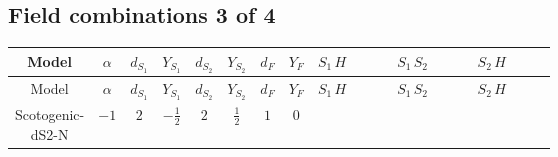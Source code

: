 \documentclass[8pt]{article}
\begin{document}
\begin{landscape}
\subsection*{Field combinations 3 of 4}
\begin{longtable}{@{}cccccccc >{\raggedright\arraybackslash}p{0.21\linewidth} >{\raggedright\arraybackslash}p{0.21\linewidth} >{\raggedright\arraybackslash}p{0.21\linewidth}@{}}
\toprule
Model & $\alpha$ & $d_{S_1}$ & $Y_{S_1}$ & $d_{S_2}$ & $Y_{S_2}$ & $d_F$ & $Y_F$ & $S_1\,H$ & $S_1\,S_2$ & $S_2\,H$ \\
\midrule
\endfirsthead
\toprule
Model & $\alpha$ & $d_{S_1}$ & $Y_{S_1}$ & $d_{S_2}$ & $Y_{S_2}$ & $d_F$ & $Y_F$ & $S_1\,H$ & $S_1\,S_2$ & $S_2\,H$ \\
\midrule
\endhead
Scotogenic-dS2-N & $-1$ & $2$ & $-\frac{1}{2}$ & $2$ & $\frac{1}{2}$ & $1$ & $0$ & \scriptsize\adjustbox{max width=\linewidth}{$\begin{gathered} +H_{a_2} S_{1,j_2} H_{a_1}{}^{\dagger } S_{1,j_1}{}^{\dagger } \mathcal{I}_{H1,a_1,a_2,j_1,j_2}{}^1 \lambda_{HS_1}^{(1)}^{(1)} \\ +H_{a_2} S_{1,j_2} H_{a_1}{}^{\dagger } S_{1,j_1}{}^{\dagger } \mathcal{I}_{H1,a_1,a_2,j_1,j_2}{}^2 \lambda_{HS_1}^{(1)}^{(2)}\end{gathered}$} & \scriptsize\adjustbox{max width=\linewidth}{$\begin{gathered} +S_{1,j_3} S_{2,j_4} S_{1,j_1}{}^{\dagger } S_{2,j_2}{}^{\dagger } \mathcal{I}_{12,j_1,j_3,j_2,j_4}{}^1 \lambda_{12}^{(1)}^{(1)} \\ +S_{1,j_3} S_{2,j_4} S_{1,j_1}{}^{\dagger } S_{2,j_2}{}^{\dagger } \mathcal{I}_{12,j_1,j_3,j_2,j_4}{}^2 \lambda_{12}^{(1)}^{(2)}\end{gathered}$} & \scriptsize\adjustbox{max width=\linewidth}{$\begin{gathered} +H_{a_2} S_{2,j_2} H_{a_1}{}^{\dagger } S_{2,j_1}{}^{\dagger } \mathcal{I}_{H2,a_1,a_2,j_1,j_2}{}^1 \lambda_{HS_2}^{(1)}^{(1)} \\ +H_{a_2} S_{2,j_2} H_{a_1}{}^{\dagger } S_{2,j_1}{}^{\dagger } \mathcal{I}_{H2,a_1,a_2,j_1,j_2}{}^2 \lambda_{HS_2}^{(1)}^{(2)}\end{gathered}$} \\
\midrule
\bottomrule
\end{longtable}
\clearpage

\end{landscape}
\end{document}
